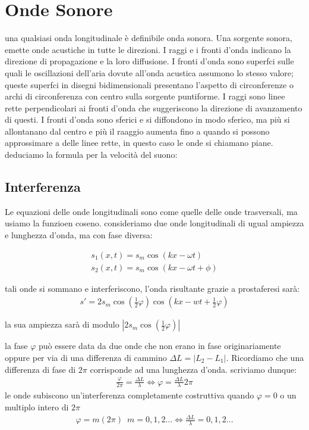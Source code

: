 \documentclass[a4paper,11pt]{article}
\begin{document}
\section{Onde Sonore }

una qualsiasi onda longitudinale è definibile onda sonora. Una sorgente sonora, emette onde acustiche in tutte le direzioni. I raggi e i fronti d'onda indicano la direzione di propagazione e la loro diffusione. I fronti d'onda sono superfci sulle quali le oscillazioni dell'aria dovute all'onda acustica assumono lo stesso valore; queste superfci in disegni bidimensionali presentano l'aspetto di circonferenze o archi di circonferenza con centro sulla sorgente puntiforme. I raggi sono linee rette perpendicolari ai fronti d'onda che suggeriscono la direzione di avanzamento di questi.
I fronti d'onda sono sferici e si diffondono in modo sferico, ma più si allontanano dal centro e più il raaggio aumenta fino a quando si possono approssimare a delle linee rette, in questo caso le onde si chiamano piane.
\\
deduciamo la formula per la velocità del suono:



\subsection{Interferenza}
Le equazioni delle onde longitudinali sono come quelle delle onde trasversali, ma usiamo la funzioen coseno. consideriamo due onde longitudinali di ugual ampiezza e lunghezza d'onda, ma con fase diversa:

\begin{align*}
    s_1(x,t) = s_m \cos(kx - \omega t) 
     \\
     s_2(x,t) = s_m \cos(kx - \omega t + \phi) 
\end{align*}

tali onde si sommano e interferiscono, l'onda risultante grazie a prostaferesi sarà:
\begin{align*}
    s' = 2s_m \cos \left(\frac{1}{2}\varphi\right) \cos\left(kx - wt + \frac{1}{2}\varphi\right)
\end{align*}

 la sua ampiezza sarà di modulo  \(\left\lvert 2s_m \cos \left(\frac{1}{2}\varphi\right) \right\rvert\) 

la fase \(\varphi\) può essere data da due onde che non erano in fase originariamente oppure per via di una differenza di cammino \(\Delta L = \left\lvert L_2 - L_1\right\rvert  \). Ricordiamo che una differenza di fase di \(2\pi\) corrisponde ad una lunghezza d'onda. scriviamo dunque:
\begin{align*}
    \frac{\varphi}{2\pi} = \frac{\Delta L}{\lambda} \Leftrightarrow \varphi = \frac{\Delta L}{\lambda} 2\pi
\end{align*}
le onde subiscono un'interferenza completamente costruttiva quando \(\varphi = 0\) o un multiplo intero di \(2\pi\) 
\begin{align*}
    \varphi = m(2\pi ) \, \, \, m = 0,1,2... \Longleftrightarrow \frac{\Delta L}{\lambda} = 0,1,2...
\end{align*}
\end{document}

